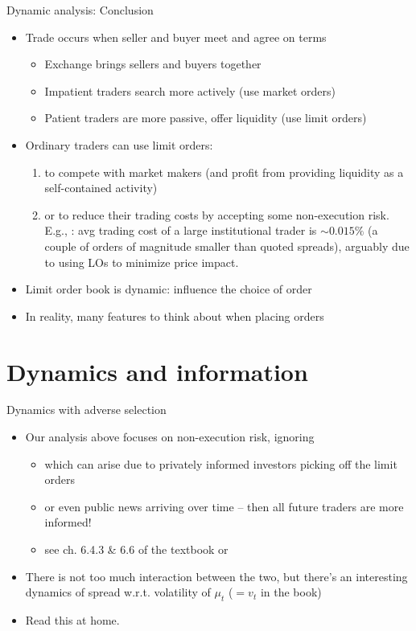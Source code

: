 \documentclass[english,10pt
,aspectratio=169
]{beamer}
\begin{document}
\begin{frame}[label=parlourmain]{Dynamic analysis: Conclusion}
\begin{itemize}
	\item Trade occurs when seller and buyer meet and agree on terms
	\begin{itemize}
		\item Exchange brings sellers and buyers together
		\item Impatient traders search more actively (use market orders)
		\item Patient traders are more passive, offer liquidity (use limit orders)
	\end{itemize}
	\item Ordinary traders can use limit orders:
	\begin{enumerate}
		\item to compete with market makers (and profit from providing liquidity as a self-contained activity)
		\item or to reduce their trading costs by accepting some non-execution risk. E.g., \citet*{frazzini_trading_2018}: avg trading cost of a large institutional trader is $\sim 0.015\%$ (a couple of orders of magnitude smaller than quoted spreads), arguably due to using LOs to minimize price impact.
	\end{enumerate}
	\item Limit order book is dynamic: influence the choice of order
	\item In reality, many features to think about when placing orders
\end{itemize}
\end{frame}



\section{Dynamics and information}

\begin{frame}{Dynamics with adverse selection}
	\begin{itemize}
		\item Our analysis above focuses on non-execution risk, ignoring 
		\begin{itemize}
			\item which can arise due to privately informed investors picking off the limit orders
			\item or even \alert{public news} arriving over time -- then all future traders are more informed!
			\item see ch. 6.4.3 \& 6.6 of the textbook or \hyperlink{adverse}{}
		\end{itemize}
		\item There is not too much interaction between the two, but there's an interesting dynamics of spread w.r.t. volatility of $\mu_t$ ($=v_t$ in the book)
		\item Read this at home.
	\end{itemize}
\end{frame}
\end{document}
